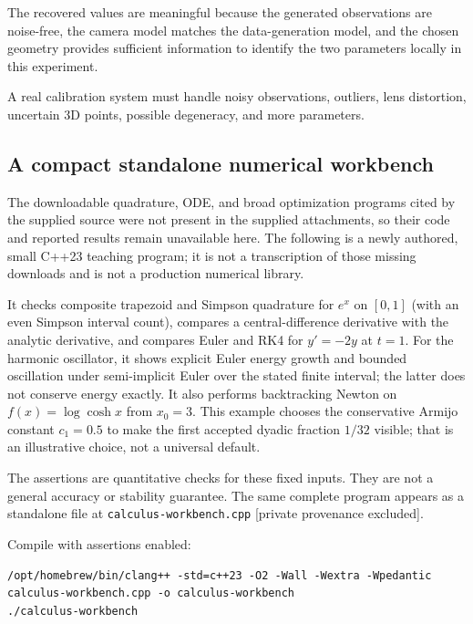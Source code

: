 The recovered values are meaningful because the generated observations are noise-free, the camera model matches the data-generation model, and the chosen geometry provides sufficient information to identify the two parameters locally in this experiment.

A real calibration system must handle noisy observations, outliers, lens distortion, uncertain 3D points, possible degeneracy, and more parameters.

\subsection{A compact standalone numerical workbench}\label{02-foundations-ii-ch028-a-compact-standalone-numerical-workbench}

The downloadable quadrature, ODE, and broad optimization programs cited by the supplied source were not present in the supplied attachments, so their code and reported results remain unavailable here. The following is a newly authored, small C++23 teaching program; it is not a transcription of those missing downloads and is not a production numerical library.

It checks composite trapezoid and Simpson quadrature for \(e^x\) on \([0,1]\) (with an even Simpson interval count), compares a central-difference derivative with the analytic derivative, and compares Euler and RK4 for \(y'=-2y\) at \(t=1\). For the harmonic oscillator, it shows explicit Euler energy growth and bounded oscillation under semi-implicit Euler over the stated finite interval; the latter does not conserve energy exactly. It also performs backtracking Newton on \(f(x)=\log\cosh x\) from \(x_0=3\). This example chooses the conservative Armijo constant \(c_1=0.5\) to make the first accepted dyadic fraction \(1/32\) visible; that is an illustrative choice, not a universal default.

The assertions are quantitative checks for these fixed inputs. They are not a general accuracy or stability guarantee. The same complete program appears as a standalone file at {\texttt{calculus-workbench.cpp} {[}private provenance excluded{]}}.

Compile with assertions enabled:

\begin{verbatim}
/opt/homebrew/bin/clang++ -std=c++23 -O2 -Wall -Wextra -Wpedantic calculus-workbench.cpp -o calculus-workbench
./calculus-workbench
\end{verbatim}

